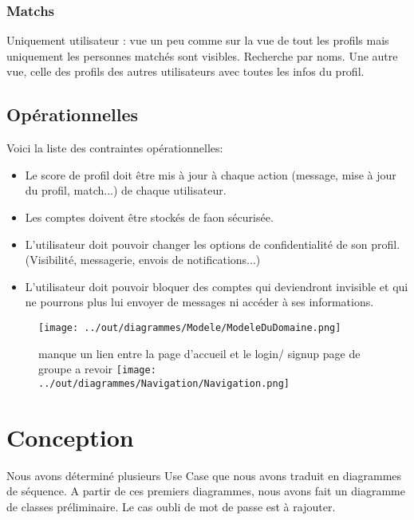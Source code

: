 \documentclass{scrartcl}
\begin{document}
        \subsubsection{Matchs} 
            Uniquement utilisateur : vue un peu comme sur la vue de tout les profils mais uniquement les personnes matchés sont visibles. Recherche par noms.
            Une autre vue, celle des profils des autres utilisateurs avec toutes les infos du profil. \newline
    
        \subsection{Opérationnelles}
        Voici la liste des contraintes opérationnelles:

        \begin{itemize}
            \item Le score de profil doit être mis à jour à chaque action (message, mise  à jour du profil, match...) de chaque utilisateur.
            \item Les comptes doivent être stockés de faon sécurisée.
            \item L'utilisateur doit pouvoir changer les options de confidentialité de son profil. (Visibilité, messagerie, envois de notifications...)
            \item L'utilisateur doit pouvoir bloquer des comptes qui deviendront invisible et qui ne pourrons plus lui envoyer de messages ni accéder à ses informations.
        \end{itemize}
    	
    	\begin{figure}[h]
    		\centering
    		\texttt{[image: ../out/diagrammes/Modele/ModeleDuDomaine.png]}
    	\end{figure}
    	\begin{figure}[h]
            \centering
            manque un lien entre la page d'accueil et le login/ signup \newline
            page de groupe a revoir
    		\texttt{[image: ../out/diagrammes/Navigation/Navigation.png]}
    	\end{figure}


\newpage
\section{Conception}

Nous avons déterminé plusieurs Use Case que nous avons traduit en diagrammes de séquence. A partir de ces premiers diagrammes, nous avons fait un diagramme de classes préliminaire.
\newline 
Le cas oubli de mot de passe est à rajouter.
\end{document}
